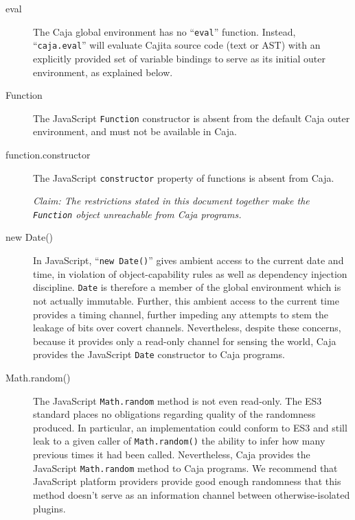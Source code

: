 \documentclass[letterpaper,twocolumn,10pt]{article}
\newcommand{\code}[1]{{\tt {#1}}}              %
\begin{document}
\begin{description}

    \item[eval] The Caja global environment has no ``\code{eval}'' function. 
    Instead, ``\code{caja.eval}'' will evaluate Cajita source code (text or 
    AST) with an explicitly provided set of variable bindings to serve as its 
    initial outer environment, as explained below.
    
    \item[Function] The JavaScript \code{Function} constructor is absent from 
    the default Caja outer environment, and must not be available in Caja.
    
    \item[function.constructor] The JavaScript \code{constructor} property of 
    functions is absent from Caja.
    
    \emph{Claim: The restrictions stated in this document together make the 
    \code{Function} object unreachable from Caja programs.}

    \item[new Date()] In JavaScript, ``\code{new Date()}''  gives ambient 
    access to the current date and time, in violation of object-capability 
    rules as well as dependency injection discipline. \code{Date} is 
    therefore a member of the global environment which is not actually 
    immutable. Further, this ambient access to the current time provides a 
    timing channel, further impeding any attempts to stem the leakage of bits 
    over covert channels. Nevertheless, despite these concerns, because it 
    provides only a read-only channel for sensing the world, Caja provides 
    the JavaScript \code{Date} constructor to Caja programs.

    \item[Math.random()] The JavaScript \code{Math.random} method is not even 
    read-only. The ES3 standard places no obligations regarding quality of the
    randomness produced. In particular, an implementation could conform to ES3
    and still leak to a given caller of \code{Math.random()} the ability to
    infer how many previous times it had been called. Nevertheless, Caja
    provides the JavaScript \code{Math.random} method to Caja programs. We
    recommend that JavaScript platform providers provide good enough
    randomness that this method doesn't serve as an information channel
    between otherwise-isolated plugins.
    
\end{description}
\end{document}
